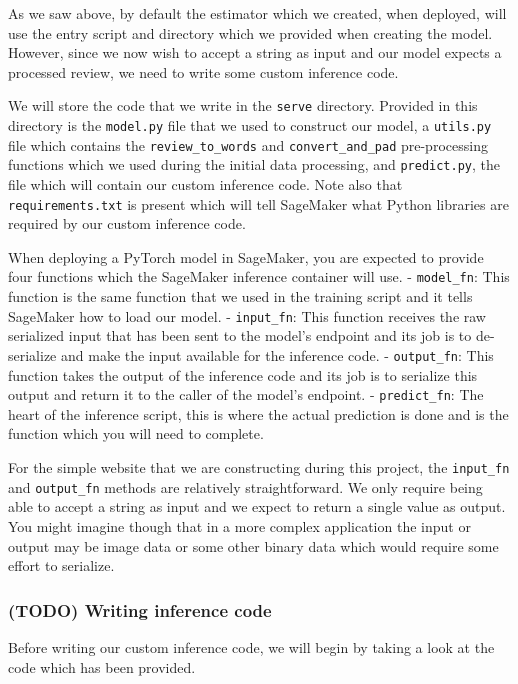 \documentclass[11pt]{article}
\begin{document}
As we saw above, by default the estimator which we created, when
deployed, will use the entry script and directory which we provided when
creating the model. However, since we now wish to accept a string as
input and our model expects a processed review, we need to write some
custom inference code.

We will store the code that we write in the \texttt{serve} directory.
Provided in this directory is the \texttt{model.py} file that we used to
construct our model, a \texttt{utils.py} file which contains the
\texttt{review\_to\_words} and \texttt{convert\_and\_pad} pre-processing
functions which we used during the initial data processing, and
\texttt{predict.py}, the file which will contain our custom inference
code. Note also that \texttt{requirements.txt} is present which will
tell SageMaker what Python libraries are required by our custom
inference code.

When deploying a PyTorch model in SageMaker, you are expected to provide
four functions which the SageMaker inference container will use. -
\texttt{model\_fn}: This function is the same function that we used in
the training script and it tells SageMaker how to load our model. -
\texttt{input\_fn}: This function receives the raw serialized input that
has been sent to the model's endpoint and its job is to de-serialize and
make the input available for the inference code. - \texttt{output\_fn}:
This function takes the output of the inference code and its job is to
serialize this output and return it to the caller of the model's
endpoint. - \texttt{predict\_fn}: The heart of the inference script,
this is where the actual prediction is done and is the function which
you will need to complete.

For the simple website that we are constructing during this project, the
\texttt{input\_fn} and \texttt{output\_fn} methods are relatively
straightforward. We only require being able to accept a string as input
and we expect to return a single value as output. You might imagine
though that in a more complex application the input or output may be
image data or some other binary data which would require some effort to
serialize.

\hypertarget{todo-writing-inference-code}{%
\subsubsection{(TODO) Writing inference
code}\label{todo-writing-inference-code}}

Before writing our custom inference code, we will begin by taking a look
at the code which has been provided.
\end{document}
